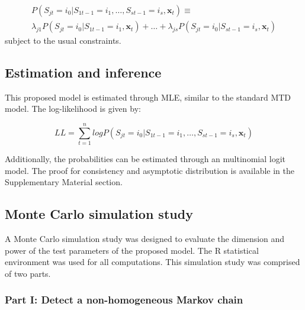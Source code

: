 \begin{multline}
P(S_{jt} =  i_0 | S_{1t-1} = i_1,\dots, S_{st-1} = i_s, \boldsymbol{x}_t) \equiv \\
\lambda_{j1}P(S_{jt} =  i_0 | S_{1t-1} = i_1,\boldsymbol{x}_t) + \dots + \lambda_{js}P(S_{jt} =  i_0 | S_{st-1} = i_s, \boldsymbol{x}_t) \label{eq:eq9}
\end{multline} subject to the usual constraints.

\hypertarget{estimation-and-inference}{%
\subsection{Estimation and inference}\label{estimation-and-inference}}

This proposed model is estimated through MLE, similar to the standard MTD model. The log-likelihood is given by:

\begin{equation}
LL = \sum_{t = 1}^n log P(S_{jt} =  i_0 | S_{1t-1} = i_1, \dots, S_{st-1} = i_s, \boldsymbol{x}_t) \label{eq:eq10}
\end{equation}

Additionally, the probabilities can be estimated through an multinomial logit model. The proof for consistency and asymptotic distribution is available in the Supplementary Material section.

\hypertarget{monte-carlo-simulation-study}{%
\subsection{Monte Carlo simulation study}\label{monte-carlo-simulation-study}}

A Monte Carlo simulation study was designed to evaluate the dimension and power of the test parameters of the proposed model. The R statistical environment was used for all computations. This simulation study was comprised of two parts.

\hypertarget{part-i-detect-a-non-homogeneous-markov-chain}{%
\subsubsection{Part I: Detect a non-homogeneous Markov chain}\label{part-i-detect-a-non-homogeneous-markov-chain}}

